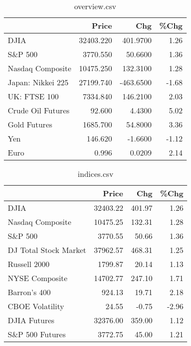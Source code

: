 \documentclass{article}%
\begin{document}
\begin{table}[htbp]%
\caption{overview.csv}%
\centering%
\begin{adjustbox}{width=1\textwidth}%
\begin{tabular}{lrrr}
\toprule
                  &     Price &       Chg &  \%Chg \\
\midrule
             DJIA & 32403.220 &  401.9700 &  1.26 \\
          S\&P 500 &  3770.550 &   50.6600 &  1.36 \\
 Nasdaq Composite & 10475.250 &  132.3100 &  1.28 \\
Japan: Nikkei 225 & 27199.740 & -463.6500 & -1.68 \\
     UK: FTSE 100 &  7334.840 &  146.2100 &  2.03 \\
Crude Oil Futures &    92.600 &    4.4300 &  5.02 \\
     Gold Futures &  1685.700 &   54.8000 &  3.36 \\
              Yen &   146.620 &   -1.6600 & -1.12 \\
             Euro &     0.996 &    0.0209 &  2.14 \\
\bottomrule
\end{tabular}
%
\end{adjustbox}%
\end{table}

%


\begin{table}[htbp]%
\caption{indices.csv}%
\centering%
\begin{adjustbox}{width=1\textwidth}%
\begin{tabular}{lrrr}
\toprule
                      &    Price &    Chg &  \%Chg \\
\midrule
                 DJIA & 32403.22 & 401.97 &  1.26 \\
     Nasdaq Composite & 10475.25 & 132.31 &  1.28 \\
              S\&P 500 &  3770.55 &  50.66 &  1.36 \\
DJ Total Stock Market & 37962.57 & 468.31 &  1.25 \\
         Russell 2000 &  1799.87 &  20.14 &  1.13 \\
       NYSE Composite & 14702.77 & 247.10 &  1.71 \\
         Barron's 400 &   924.13 &  19.71 &  2.18 \\
      CBOE Volatility &    24.55 &  -0.75 & -2.96 \\
         DJIA Futures & 32376.00 & 359.00 &  1.12 \\
      S\&P 500 Futures &  3772.75 &  45.00 &  1.21 \\
\bottomrule
\end{tabular}
%
\end{adjustbox}%
\end{table}
\end{document}
